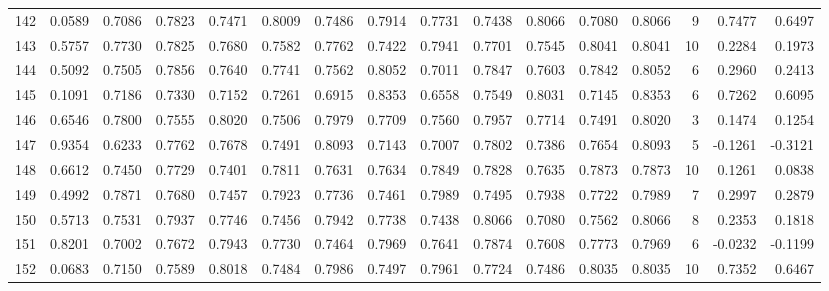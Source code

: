 \begin{tabular}{lrrrrrrrrrrrrrrr}
142 &      0.0589 &  0.7086 &  0.7823 &  0.7471 &  0.8009 &  0.7486 &  0.7914 &  0.7731 &  0.7438 &  0.8066 &   0.7080 &     0.8066 &      9 &                    0.7477 &                     0.6497 \\
143 &      0.5757 &  0.7730 &  0.7825 &  0.7680 &  0.7582 &  0.7762 &  0.7422 &  0.7941 &  0.7701 &  0.7545 &   0.8041 &     0.8041 &     10 &                    0.2284 &                     0.1973 \\
144 &      0.5092 &  0.7505 &  0.7856 &  0.7640 &  0.7741 &  0.7562 &  0.8052 &  0.7011 &  0.7847 &  0.7603 &   0.7842 &     0.8052 &      6 &                    0.2960 &                     0.2413 \\
145 &      0.1091 &  0.7186 &  0.7330 &  0.7152 &  0.7261 &  0.6915 &  0.8353 &  0.6558 &  0.7549 &  0.8031 &   0.7145 &     0.8353 &      6 &                    0.7262 &                     0.6095 \\
146 &      0.6546 &  0.7800 &  0.7555 &  0.8020 &  0.7506 &  0.7979 &  0.7709 &  0.7560 &  0.7957 &  0.7714 &   0.7491 &     0.8020 &      3 &                    0.1474 &                     0.1254 \\
147 &      0.9354 &  0.6233 &  0.7762 &  0.7678 &  0.7491 &  0.8093 &  0.7143 &  0.7007 &  0.7802 &  0.7386 &   0.7654 &     0.8093 &      5 &                   -0.1261 &                    -0.3121 \\
148 &      0.6612 &  0.7450 &  0.7729 &  0.7401 &  0.7811 &  0.7631 &  0.7634 &  0.7849 &  0.7828 &  0.7635 &   0.7873 &     0.7873 &     10 &                    0.1261 &                     0.0838 \\
149 &      0.4992 &  0.7871 &  0.7680 &  0.7457 &  0.7923 &  0.7736 &  0.7461 &  0.7989 &  0.7495 &  0.7938 &   0.7722 &     0.7989 &      7 &                    0.2997 &                     0.2879 \\
150 &      0.5713 &  0.7531 &  0.7937 &  0.7746 &  0.7456 &  0.7942 &  0.7738 &  0.7438 &  0.8066 &  0.7080 &   0.7562 &     0.8066 &      8 &                    0.2353 &                     0.1818 \\
151 &      0.8201 &  0.7002 &  0.7672 &  0.7943 &  0.7730 &  0.7464 &  0.7969 &  0.7641 &  0.7874 &  0.7608 &   0.7773 &     0.7969 &      6 &                   -0.0232 &                    -0.1199 \\
152 &      0.0683 &  0.7150 &  0.7589 &  0.8018 &  0.7484 &  0.7986 &  0.7497 &  0.7961 &  0.7724 &  0.7486 &   0.8035 &     0.8035 &     10 &                    0.7352 &                     0.6467 \\

\end{tabular}
